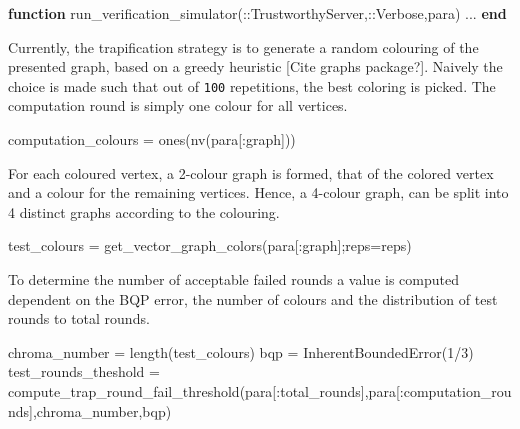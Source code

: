 \documentclass[
]{article}
\newenvironment{Shaded}{}{}
\newcommand{\DataTypeTok}[1]{\textcolor[rgb]{0.56,0.13,0.00}{#1}}
\newcommand{\FloatTok}[1]{\textcolor[rgb]{0.25,0.63,0.44}{#1}}
\newcommand{\FunctionTok}[1]{\textcolor[rgb]{0.02,0.16,0.49}{#1}}
\newcommand{\KeywordTok}[1]{\textcolor[rgb]{0.00,0.44,0.13}{\textbf{#1}}}
\newcommand{\NormalTok}[1]{#1}
\newcommand{\OperatorTok}[1]{\textcolor[rgb]{0.40,0.40,0.40}{#1}}
\begin{document}
\begin{Shaded}
\begin{Highlighting}[]
    \KeywordTok{function} \FunctionTok{run\_verification\_simulator}\NormalTok{(}\OperatorTok{::}\DataTypeTok{TrustworthyServer}\NormalTok{,}\OperatorTok{::}\DataTypeTok{Verbose}\NormalTok{,para)}
    \OperatorTok{...}
    \KeywordTok{end}
\end{Highlighting}
\end{Shaded}

Currently, the trapification strategy is to generate a random colouring
of the presented graph, based on a greedy heuristic {[}Cite graphs
package?{]}. Naively the choice is made such that out of \texttt{100}
repetitions, the best coloring is picked. The computation round is
simply one colour for all vertices.

\begin{Shaded}
\begin{Highlighting}[]
\NormalTok{    computation\_colours }\OperatorTok{=} \FunctionTok{ones}\NormalTok{(}\FunctionTok{nv}\NormalTok{(para[}\OperatorTok{:}\NormalTok{graph]))}
\end{Highlighting}
\end{Shaded}

For each coloured vertex, a 2-colour graph is formed, that of the
colored vertex and a colour for the remaining vertices. Hence, a
4-colour graph, can be split into 4 distinct graphs according to the
colouring.

\begin{Shaded}
\begin{Highlighting}[]
\NormalTok{    test\_colours }\OperatorTok{=} \FunctionTok{get\_vector\_graph\_colors}\NormalTok{(para[}\OperatorTok{:}\NormalTok{graph];reps}\OperatorTok{=}\NormalTok{reps)}
\end{Highlighting}
\end{Shaded}

To determine the number of acceptable failed rounds a value is computed
dependent on the BQP error, the number of colours and the distribution
of test rounds to total rounds.

\begin{Shaded}
\begin{Highlighting}[]
\NormalTok{    chroma\_number }\OperatorTok{=} \FunctionTok{length}\NormalTok{(test\_colours)}
\NormalTok{    bqp }\OperatorTok{=} \FunctionTok{InherentBoundedError}\NormalTok{(}\FloatTok{1}\OperatorTok{/}\FloatTok{3}\NormalTok{)}
\NormalTok{    test\_rounds\_theshold }\OperatorTok{=} \FunctionTok{compute\_trap\_round\_fail\_threshold}\NormalTok{(para[}\OperatorTok{:}\NormalTok{total\_rounds],para[}\OperatorTok{:}\NormalTok{computation\_rounds],chroma\_number,bqp) }
\end{Highlighting}
\end{Shaded}
\end{document}
